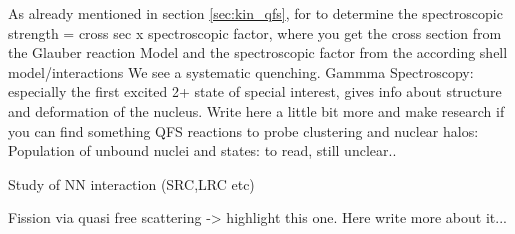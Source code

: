 \begin{description}
\end{description}





As already mentioned in section \ref{sec:kin_qfs}, for to determine the spectroscopic strength = cross sec x spectroscopic factor, where you get the cross section from the Glauber reaction Model and the spectroscopic factor from the according shell model/interactions
We see a systematic quenching.
\newline
Gammma Spectroscopy:
especially the first excited 2+ state of special interest, gives info about structure and deformation of the nucleus. Write here a little bit more and make research if you can find something\newline
QFS reactions to probe clustering and nuclear halos:
\newline
Population of unbound nuclei and states: to read, still unclear..\newline

Study of NN interaction (SRC,LRC etc) \newline

Fission via quasi free scattering -> highlight this one. Here write more about it...
\newline



